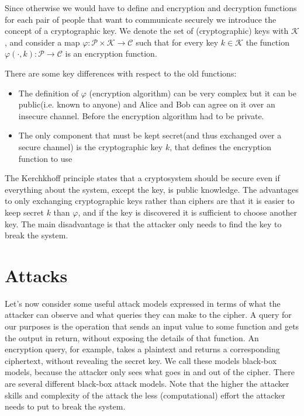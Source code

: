 Since otherwise we would have to define and encryption and decryption functions for each pair of people that want to communicate securely we introduce the concept of a cryptographic key. We denote the set of (cryptographic) keys with $\mathcal{K}$, and consider a map 
$\varphi : \mathcal{P} \times \mathcal{K} \rightarrow \mathcal{C}$ such that for every key $k\in \mathcal{K}$ the function $\varphi(\cdot, k) : \mathcal{P} \rightarrow \mathcal{C}$ is an encryption function.

There are some key differences with respect to the old functions:
\begin{itemize}
	\item The definition of $\varphi$ (encryption algorithm) can be very complex but it can be public(i.e. known to anyone) and Alice and Bob can agree on it over an insecure channel. Before the encryption algorithm had to be private.
	\item The only component that must be kept secret(and thus exchanged over a secure channel) is the cryptographic key $k$, that defines the encryption function to use
\end{itemize}

The Kerchkhoff principle states that a cryptosystem should be secure even if everything about the system, except the key, is public knowledge. The advantages to only exchanging cryptographic keys rather than ciphers are that it is easier to keep secret $k$ than $\varphi$, and if the key is discovered it is sufficient to choose another key. The main disadvantage is that the attacker only needs to find the key to break the system.


\section{Attacks}
Let’s now consider some useful attack models expressed in terms of what the attacker can observe and what queries they can make to the cipher. A query for our purposes is the operation that sends an input value to some function and gets the output in return, without exposing the details of that function. An encryption query, for example, takes a plaintext and returns a corresponding ciphertext, without revealing the secret key. We call these models black-box models, because the attacker only sees what goes in and out of the cipher.
There are several different black-box attack models.  Note that the higher the attacker skills and complexity of the attack the less (computational) effort the attacker needs to put to break the system.

